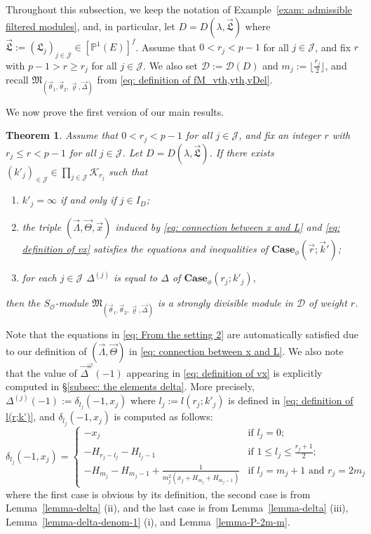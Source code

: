 \documentclass[11pt]{amsart}
\theoremstyle{definition}
\numberwithin{equation}{subsection}
\theoremstyle{plain}
\newtheorem{theo}[equation]{Theorem}
\theoremstyle{plain}
\theoremstyle{plain}
\theoremstyle{plain}
\theoremstyle{plain}
\theoremstyle{plain}
\theoremstyle{plain}
\theoremstyle{plain}
\theoremstyle{plain}
\theoremstyle{plain}
\theoremstyle{plain}
\theoremstyle{plain}
\theoremstyle{definition}
\theoremstyle{definition}
\theoremstyle{definition}
\theoremstyle{remark}
\renewcommand{\(}{\textup{(}}
\renewcommand{\)}{\textup{)}}
\newcommand{\fM}{\mathfrak{M}}
\newcommand{\fL}{\mathfrak{L}}
\newcommand{\cD}{\mathcal{D}}
\newcommand{\cO}{\mathcal{O}}
\newcommand{\cJ}{\mathcal{J}}
\newcommand{\vx}{\vec{x}}
\newcommand{\vr}{\vec{r}}
\newcommand{\vL}{\vec{\fL}}
\newcommand{\vk}{\vec{k}}
\newcommand{\cK}{\mathcal{K}}
\newcommand{\vth}{\vec{\theta}}
\newcommand{\vrho}{\vec{\varrho}}
\newcommand{\vDel}{\vec{\Delta}}
\newcommand{\vLam}{\vec{\Lambda}}
\newcommand{\vTh}{\vec{\Theta}}
\begin{document}
Throughout this subsection, we keep the notation of Example~\ref{exam: admissible filtered modules}, and, in particular, let $D=D(\lambda,\vL)$ where $\vL:=(\fL_j)_{j\in\cJ}\in[\mathbb{P}^1(E)]^f$. Assume that $0<r_j<p-1$ for all $j\in\cJ$, and fix $r$ with $p-1 > r\geq r_j$ for all $j\in\cJ$. We also set $\cD:=\cD(D)$ and $m_j:=\lfloor\tfrac{r_j}{2}\rfloor$, and recall $\fM_{(\vth_1,\vth_2,\vrho,\vDel)}$ from \eqref{eq: definition of fM_vth,vth,vDel}. 



\smallskip
We now prove the first version of our main results.
\begin{theo}\label{theo: main}
Assume that $0<r_j<p-1$ for all $j\in\cJ$, and fix an integer $r$ with $r_j\leq r<p-1$ for all $j\in\cJ$. Let $D=D(\lambda,\vL)$. If there exists $(k'_{j})_{\in\cJ}\in \prod_{j\in\cJ}\cK_{r_j}$ such that
    \begin{enumerate}[leftmargin=*]
    \item $k'_j=\infty$ if and only if $j\in I_D$;
    \item the triple $(\vLam,\vTh,\vx)$ induced by \eqref{eq: connection between x and L} and \eqref{eq: definition of vx} satisfies the equations and inequalities of $\mathbf{Case}_\phi(\vr;\vk')$;
    \item for each $j\in\cJ$ $\Delta^{(j)}$ is equal to $\Delta$ of $\mathbf{Case}_\phi(r_j;k'_j)$,
    \end{enumerate}
then the $S_\cO$-module $\fM_{(\vth_1,\vth_2,\vrho,\vDel)}$ is a strongly divisible module in $\cD$ of weight $r$.
\end{theo}

Note that the equations in \eqref{eq: From the setting 2} are automatically satisfied due to our definition of $(\vLam,\vTh)$ in \eqref{eq: connection between x and L}. We also note that the value of $\vDel^\varphi(-1)$ appearing in \eqref{eq: definition of vx} is explicitly computed in \S\ref{subsec: the elements delta}. More precisely, $\Delta^{(j)}(-1):=\delta_{l_j}(-1,x_j)$ where $l_j:=l(r_j;k'_j)$ is defined in \eqref{eq: definition of l(r;k')}, and $\delta_{l_j}(-1,x_j)$ is computed as follows:
\begin{equation}\label{eq: delta(-1)}
\delta_{l_j}(-1,x_j)=
\begin{cases}
   -x_j & \mbox{if } l_j=0; \\
   -H_{r_j-l_j}-H_{l_j-1} & \mbox{if } 1\leq l_j\leq \frac{r_j+1}{2}; \\
   -H_{m_j}-H_{m_j-1}+\frac{1}{m_j^2(x_j+H_{m_j}+H_{m_j-1})} & \mbox{if } l_j=m_j +1\mbox{ and }r_j=2m_j
\end{cases}
\end{equation}
where the first case is obvious by its definition, the second case is from Lemma~\ref{lemma-delta} (ii), and the last case is from Lemma~\ref{lemma-delta} (iii), Lemma~\ref{lemma-delta-denom-1} (i), and Lemma~\ref{lemma-P-2m-m}.
\end{document}
